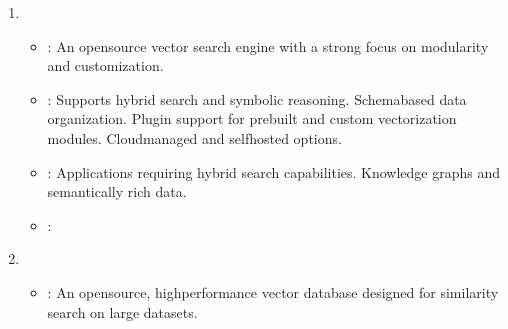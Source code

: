 \documentclass[letterpaper,11pt,english]{sphinxmanual}
\begin{document}
\begin{enumerate}
\begin{itemize}
\item {} 
\sphinxAtStartPar
{}:
\sphinxhyphen{} Scalable and serverless architecture.
\sphinxhyphen{} Automatic scaling and optimization of indexes.
\sphinxhyphen{} Hybrid search (combining vector and keyword search).
\sphinxhyphen{} Integrates with popular frameworks like LangChain and OpenAI.

\item {} 
\sphinxAtStartPar
{}:
\sphinxhyphen{} Enterprise\sphinxhyphen{}grade applications.
\sphinxhyphen{} Handling large datasets with minimal operational overhead.

\item {} 
\sphinxAtStartPar
{}: 

\end{itemize}

\item {} 
\sphinxAtStartPar
{}
\begin{itemize}
\item {} 
\sphinxAtStartPar
{}:
\sphinxhyphen{} An open\sphinxhyphen{}source vector search engine with a strong focus on modularity and customization.

\item {} 
\sphinxAtStartPar
{}:
\sphinxhyphen{} Supports hybrid search and symbolic reasoning.
\sphinxhyphen{} Schema\sphinxhyphen{}based data organization.
\sphinxhyphen{} Plugin support for pre\sphinxhyphen{}built and custom vectorization modules.
\sphinxhyphen{} Cloud\sphinxhyphen{}managed and self\sphinxhyphen{}hosted options.

\item {} 
\sphinxAtStartPar
{}:
\sphinxhyphen{} Applications requiring hybrid search capabilities.
\sphinxhyphen{} Knowledge graphs and semantically rich data.

\item {} 
\sphinxAtStartPar
{}: 

\end{itemize}

\item {} 
\sphinxAtStartPar
{}
\begin{itemize}
\item {} 
\sphinxAtStartPar
{}:
\sphinxhyphen{} An open\sphinxhyphen{}source, high\sphinxhyphen{}performance vector database designed for similarity search on large datasets.


\end{itemize}
\end{enumerate}
\end{document}
